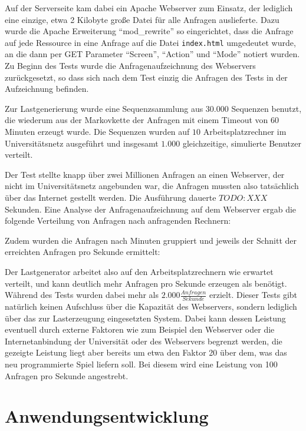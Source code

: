 \documentclass[10pt]{scrartcl}
\begin{document}
  Auf der Serverseite kam dabei ein Apache Webserver zum Einsatz, der lediglich eine einzige, etwa 2 Kilobyte große Datei für alle Anfragen auslieferte. Dazu wurde die Apache Erweiterung ``mod\_rewrite'' so eingerichtet, dass die Anfrage auf jede Ressource in eine Anfrage auf die Datei \verb|index.html| umgedeutet wurde, an die dann per GET Parameter ``Screen'', ``Action'' und ``Mode'' notiert wurden. Zu Beginn des Tests wurde die Anfragenaufzeichnung des Webservers zurückgesetzt, so dass sich nach dem Test einzig die Anfragen des Tests in der Aufzeichnung befinden.
  
  Zur Lastgenerierung wurde eine Sequenzsammlung aus $30.000$ Sequenzen benutzt, die wiederum aus der Markovkette der Anfragen mit einem Timeout von 60 Minuten erzeugt wurde. Die Sequenzen wurden auf $10$ Arbeitsplatzrechner im Universitätsnetz ausgeführt und insgesamt $1.000$ gleichzeitige, simulierte Benutzer verteilt.
  
  Der Test stellte knapp über zwei Millionen Anfragen an einen Webserver, der nicht im Universitätsnetz angebunden war, die Anfragen mussten also tatsächlich über das Internet gestellt werden. Die Ausführung dauerte $TODO: XXX$ Sekunden. Eine Analyse der Anfragenaufzeichnung auf dem Webserver ergab die folgende Verteilung von Anfragen nach anfragenden Rechnern:
  
  
  Zudem wurden die Anfragen nach Minuten gruppiert und jeweils der Schnitt der erreichten Anfragen pro Sekunde ermittelt:
  
  
  Der Lastgenerator arbeitet also auf den Arbeitsplatzrechnern wie erwartet verteilt, und kann deutlich mehr Anfragen pro Sekunde erzeugen als benötigt. Während des Tests wurden dabei mehr als $2.000 \frac{Anfragen}{Sekunde}$ erzielt. Dieser Tests gibt natürlich keinen Aufschluss über die Kapazität des Webservers, sondern lediglich über das zur Lasterzeugung eingesetzten System. Dabei kann dessen Leistung eventuell durch externe Faktoren wie zum Beispiel den Webserver oder die Internetanbindung der Universität oder des Webservers begrenzt werden, die gezeigte Leistung liegt aber bereits um etwa den Faktor 20 über dem, was das neu programmierte Spiel liefern soll. Bei diesem wird eine Leistung von 100 Anfragen pro Sekunde angestrebt.
    
  \section{Anwendungsentwicklung}
\end{document}
